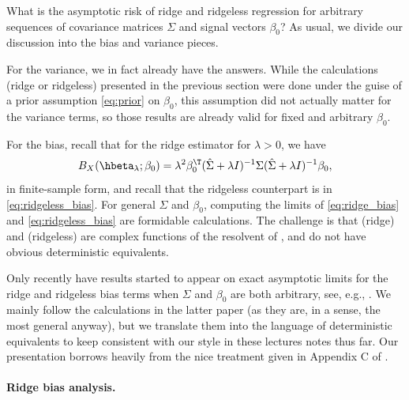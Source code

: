 \documentclass{article}
\begin{document}
What is the asymptotic risk of ridge and ridgeless regression for arbitrary
sequences of covariance matrices $\Sigma$ and signal vectors $\beta_0$? 
As usual, we divide our discussion into the bias and variance pieces. 

For the variance, we in fact already have the answers. While the calculations
(ridge or ridgeless) presented in the previous section were done under the guise
of a prior assumption \eqref{eq:prior} on $\beta_0$, this assumption did not 
actually matter for the variance terms, so those results are already valid for
fixed and arbitrary $\beta_0$.

For the bias, recall that for the ridge estimator  for $\lambda>0$, we have 
\begin{equation}
\label{eq:ridge_bias}
B_X(\hbeta_\lambda; \beta_0) = \lambda^2 \beta_0^\T (\hSigma + \lambda
I)^{-1} \Sigma (\hSigma + \lambda I)^{-1} \beta_0,
\end{equation}
in finite-sample form, and recall that the ridgeless counterpart is in  
\eqref{eq:ridgeless_bias}. For general $\Sigma$ and $\beta_0$, computing the
limits of \eqref{eq:ridge_bias} and \eqref{eq:ridgeless_bias} are formidable 
calculations. The challenge is that  (ridge) and  (ridgeless) are complex functions of
the resolvent of \smash{$\hSigma$}, and do not have obvious deterministic
equivalents. 

Only recently have results started to appear on exact asymptotic limits for the
ridge and ridgeless bias terms when $\Sigma$ and $\beta_0$ are both arbitrary,
see, e.g., \citet{wu2020optimal, richards2021asymptotics,
  hastie2022surprises}. We mainly follow the calculations in the latter paper 
(as they are, in a sense, the most general anyway), but we translate them into
the language of deterministic equivalents to keep consistent with our style in
these lectures notes thus far. Our presentation borrows heavily from the nice  
treatment given in Appendix C of \citet{patil2022facets}.     

\paragraph{Ridge bias analysis.}
\end{document}

